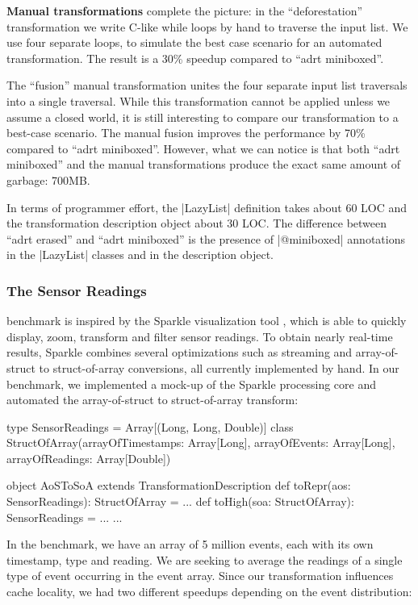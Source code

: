 \vspace{0.5em}
\noindent
\textbf{Manual transformations} complete the picture: in the ``deforestation'' transformation we write C-like while loops by hand to traverse the input list. We use four separate loops, to simulate the best case scenario for an automated transformation. The result is a 30\% speedup compared to ``adrt miniboxed''.

The ``fusion'' manual transformation unites the four separate input list traversals into a single traversal. While this transformation cannot be applied unless we assume a closed world, it is still interesting to compare our transformation to a best-case scenario. The manual fusion improves the performance by 70\% compared to ``adrt miniboxed''. However, what we can notice is that both ``adrt miniboxed'' and the manual transformations produce the exact same amount of garbage: 700MB.

In terms of programmer effort, the |LazyList| definition takes about 60 LOC and the transformation description object about 30 LOC. The difference between ``adrt erased'' and ``adrt miniboxed'' is the presence of |@miniboxed| annotations in the |LazyList| classes and in the description object.

\subsubsection{The Sensor Readings} benchmark is inspired by the Sparkle visualization tool \cite{sparkle}, which is able to quickly display, zoom, transform and filter sensor readings. To obtain nearly real-time results, Sparkle combines several optimizations such as streaming and array-of-struct to struct-of-array conversions, all currently implemented by hand. In our benchmark, we implemented a mock-up of the Sparkle processing core and automated the array-of-struct to struct-of-array transform:

\begin{lstlisting-nobreak}
type SensorReadings = Array[(Long, Long, Double)]
class StructOfArray(arrayOfTimestamps: Array[Long],
                           arrayOfEvents:     Array[Long],
                           arrayOfReadings:   Array[Double])

object AoSToSoA extends TransformationDescription {
  def toRepr(aos: SensorReadings): StructOfArray = ...
  def toHigh(soa: StructOfArray): SensorReadings = ...
  ...
}
\end{lstlisting-nobreak}

In the benchmark, we have an array of 5 million events, each with its own timestamp, type and reading. We are seeking to average the readings of a single type of event occurring in the event array. Since our transformation influences cache locality, we had two different speedups depending on the event distribution:

